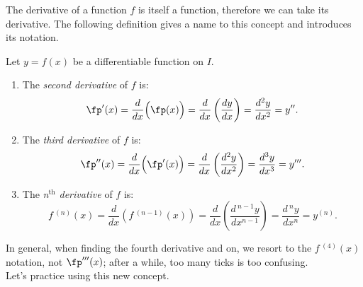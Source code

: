 The derivative of a function $f$ is itself a function, therefore we can take its derivative. The following definition gives a name to this concept and introduces its notation.
\enlargethispage{2\baselineskip}
{}
{Let $y=f(x)$ be a differentiable function on $I$. 
		\begin{enumerate}
		\item		The \textit{second derivative} of $f$ is: 
						$$ \fp'(x) = \frac{d}{dx}\Big(\fp(x)\Big) = \frac{d}{dx}\left(\frac{dy}{dx}\right) = \frac{d^2y}{dx^2}=y''.$$
				\item		The \textit{third derivative} of $f$ is: 
						$$ \fp''(x) = \frac{d}{dx}\Big(\fp'(x)\Big) = \frac{d}{dx}\left(\frac{d^2y}{dx^2}\right) = \frac{d^3y}{dx^3}=y'''.$$
				\item		The \textit{n$^{\text{th}}$ derivative} of $f$ is:
						$$ f\,^{(n)}(x) = \frac{d}{dx}\left(f\,^{(n-1)}(x)\right) = \frac{d}{dx}\left(\frac{d\,^{n-1}y}{dx^{n-1}}\right) = \frac{d\,^ny}{dx^n}=y^{(n)}.$$
		\end{enumerate}
}
\normalsize

In general, when finding the fourth derivative and on, we resort to the $f\,^{(4)}(x)$ notation, not $\fp'''(x)$; after a while, too many ticks is too confusing.\\

Let's practice using this new concept.\\

